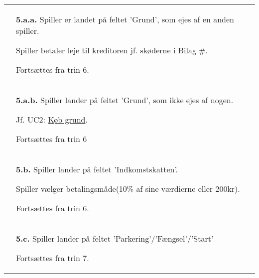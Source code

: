 \documentclass[class=article, crop=false]{standalone}
\begin{document}
\begin{table}[H]
\begin{tabularx}{\textwidth}{|l|X|}
                              & \textbf{5.a.a.} Spiller er landet på feltet
                                'Grund', som ejes af en anden spiller.
                                \begin{enumerate} \begin{tabenum}
                                  \item Spiller betaler leje til kreditoren
                                        jf. skøderne i Bilag \#.
                                  \item Fortsættes fra trin 6.
                                \end{tabenum} \end{enumerate}
                                \\
                            & \textbf{5.a.b.} Spiller lander på feltet
                                'Grund', som ikke ejes af nogen.
                            \begin{enumerate} \begin{tabenum}
                                  \item Jf. UC2: \underline{Køb grund}.
                                  \item Fortsættes fra trin 6
                            \end{tabenum} \end{enumerate}
                            \\


                            & \textbf{5.b.} Spiller lander på feltet
                            'Indkomstskatten'.
                            \begin{enumerate} \begin{tabenum}
                              \item Spiller vælger betalingsmåde(10\% af sine værdierne eller 200kr).
                              \item Fortsættes fra trin 6.
                            \end{tabenum} \end{enumerate}
                            \\


                            & \textbf{5.c.} Spiller lander på feltet 'Parkering'/'Fængsel'/'Start'
                            \begin{enumerate} \begin{tabenum}
                                                  \item Fortsættes fra trin 7.
                            \end{tabenum} \end{enumerate}
                            \\



\end{tabularx}
\end{table}
\end{document}
